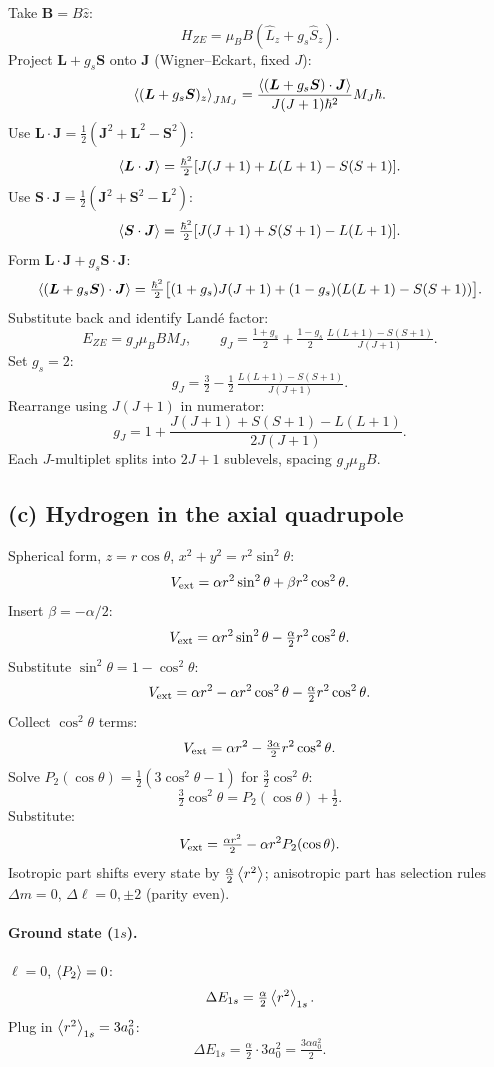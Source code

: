 \documentclass[11pt]{article}
\begin{document}
Take $\bm B=B\hat z$:
\[
H_{ZE}=\mu_B B(\hat L_z+g_s\hat S_z).
\]
Project $\bm L+g_s\bm S$ onto $\bm J$ (Wigner--Eckart, fixed $J$):
\[
\Braket{(\bm L+g_s\bm S)_z}_{JM_J}=\frac{\Braket{(\bm L+g_s\bm S)\cdot\bm J}}{J(J+1)\hbar^2}M_J\hbar.
\]
Use $\bm L\cdot\bm J=\tfrac12(\bm J^2+\bm L^2-\bm S^2)$:
\[
\Braket{\bm L\cdot\bm J}=\tfrac{\hbar^2}{2}[J(J+1)+L(L+1)-S(S+1)].
\]
Use $\bm S\cdot\bm J=\tfrac12(\bm J^2+\bm S^2-\bm L^2)$:
\[
\Braket{\bm S\cdot\bm J}=\tfrac{\hbar^2}{2}[J(J+1)+S(S+1)-L(L+1)].
\]
Form $\bm L\cdot\bm J+g_s\bm S\cdot\bm J$:
\[
\Braket{(\bm L+g_s\bm S)\cdot\bm J}=\tfrac{\hbar^2}{2}\bigl[(1+g_s)J(J+1)+(1-g_s)(L(L+1)-S(S+1))\bigr].
\]
Substitute back and identify Land\'e factor:
\[
E_{ZE}=g_J\mu_B B M_J,\qquad g_J=\tfrac{1+g_s}{2}+\tfrac{1-g_s}{2}\,\tfrac{L(L+1)-S(S+1)}{J(J+1)}.
\]
Set $g_s=2$:
\[
g_J=\tfrac{3}{2}-\tfrac{1}{2}\,\tfrac{L(L+1)-S(S+1)}{J(J+1)}.
\]
Rearrange using $J(J+1)$ in numerator:
\begin{equation}
\boxed{\;g_J=1+\frac{J(J+1)+S(S+1)-L(L+1)}{2J(J+1)}.\;}
\label{eq:gJ}
\end{equation}
Each $J$-multiplet splits into $2J+1$ sublevels, spacing $g_J\mu_B B$.

\subsection*{(c) Hydrogen in the axial quadrupole}

Spherical form, $z=r\cos\theta$, $x^2+y^2=r^2\sin^2\theta$:
\[
V_{\rm ext}=\alpha r^2\sin^2\theta+\beta r^2\cos^2\theta.
\]
Insert $\beta=-\alpha/2$:
\[
V_{\rm ext}=\alpha r^2\sin^2\theta-\tfrac{\alpha}{2}r^2\cos^2\theta.
\]
Substitute $\sin^2\theta=1-\cos^2\theta$:
\[
V_{\rm ext}=\alpha r^2-\alpha r^2\cos^2\theta-\tfrac{\alpha}{2}r^2\cos^2\theta.
\]
Collect $\cos^2\theta$ terms:
\[
V_{\rm ext}=\alpha r^2-\tfrac{3\alpha}{2}r^2\cos^2\theta.
\]
Solve $P_2(\cos\theta)=\tfrac{1}{2}(3\cos^2\theta-1)$ for $\tfrac{3}{2}\cos^2\theta$:
\[
\tfrac{3}{2}\cos^2\theta=P_2(\cos\theta)+\tfrac{1}{2}.
\]
Substitute:
\begin{equation}
V_{\rm ext}=\tfrac{\alpha r^2}{2}-\alpha r^2 P_2(\cos\theta).
\label{eq:Vext}
\end{equation}
Isotropic part shifts every state by $\tfrac\alpha2\Braket{r^2}$; anisotropic part has selection rules $\Delta m=0$, $\Delta\ell=0,\pm 2$ (parity even).

\paragraph{Ground state ($1s$).} $\ell=0$, $\Braket{P_2}=0$:
\[
\Delta E_{1s}=\tfrac{\alpha}{2}\Braket{r^2}_{1s}.
\]
Plug in $\Braket{r^2}_{1s}=3a_0^2$:
\[
\Delta E_{1s}=\tfrac{\alpha}{2}\cdot 3a_0^2=\tfrac{3\alpha a_0^2}{2}.
\]
\end{document}
